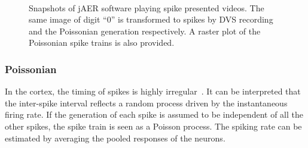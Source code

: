 \documentclass[journal]{journal}
\begin{document}
	\begin{figure}[hbt]
		\centering
		\\
		
		\caption{
			Snapshots of jAER software playing spike presented videos.
			The same image of digit ``0'' is transformed to spikes by DVS recording and the Poissonian generation respectively.
			A raster plot of the Poissonian spike trains is also provided.}
		\label{fig:zero}
	\end{figure}
	
	\subsubsection{Poissonian}
	
	In the cortex, the timing of spikes is highly irregular~\cite{squire1998findings}.
	It can be interpreted that the inter-spike interval reflects a random process driven by the instantaneous firing rate.
	If the generation of each spike is assumed to be independent of all the other spikes, the spike train is seen as a Poisson process.
	The spiking rate can be estimated by averaging the pooled responses of the neurons.
	
\end{document}
